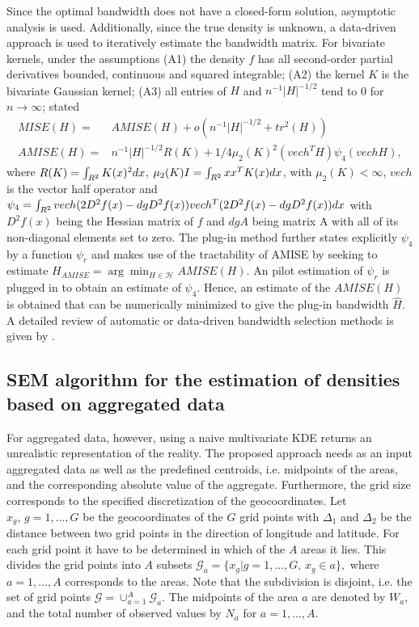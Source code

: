 Since the optimal bandwidth does not have a closed-form solution, asymptotic analysis is used. Additionally, since the true density is unknown, a data-driven approach is used to iteratively estimate the bandwidth matrix. For bivariate kernels, under the assumptions
(A1) the density $f$ has all second-order partial derivatives
bounded, continuous and squared integrable;
(A2) the kernel $K$ is the bivariate Gaussian kernel;
(A3) all entries of $H$ and $n^{-1} |H|^{-1/2}$ tend to 0 for $n \to \infty$; 
\cite{Duong2003} stated 
\begin{align*}
    MISE(H) = & AMISE(H) + o(n^{-1} |H|^{-1/2} + tr^2(H)) \\
    AMISE(H) = & n^{-1} |H|^{-1/2} R(K) + 1/4 \mu_2(K)^2(vech^TH) \psi_4 (vech H),
\end{align*}
where $R(K) = \int_{R^2} K(x)^2 d x$, 
$\mu_2(K)I = \int_{R^2} xx^T K(x) d x$, with $\mu_2(K) < \infty$, $vech$ is the vector half operator and 
$\psi_4 = \int_{R^2} vech(2D^2f(x) - d gD^2 f(x)) vech^T(2D^2f(x) - d gD^2 f(x))d x$ with $D^2f(x)$ being the Hessian matrix of $f$ and $d gA$ being matrix A with all of its non-diagonal elements set to zero. 
The plug-in method further states explicitly $\psi_4$ by a function $\psi_r$ and makes use of the tractability of AMISE by seeking to estimate 
$H_{AMISE} = \arg \min_{H \in \mathcal{H}} AMISE(H)$.
An pilot estimation of $\psi_r$ is plugged in to obtain an estimate of $\psi_4$. Hence, an estimate of the $AMISE(H)$ is obtained that can be numerically minimized to give the plug-in bandwidth $\hat{H}$.   \\
A detailed review of automatic or data-driven bandwidth selection methods is given by \cite{Sperlich2013}. 


\subsection{SEM algorithm for the estimation of densities based on aggregated data}
For aggregated data, however, using a naive multivariate KDE returns an unrealistic representation of the reality. The proposed approach needs as an input aggregated data as well as the predefined centroids, i.e. midpoints of the areas, and the corresponding absolute value of the aggregate. 
Furthermore, the grid size corresponds to the specified discretization of the geocoordinates. Let $x_g,\, g = 1, \dots, G$ be the geocoordinates of the $G$ grid points with $\Delta_1$ and $\Delta_2$ be the distance between two grid points in the direction of longitude and latitude. 
For each grid point it have to be determined in which of the $A$ areas it lies. This divides the grid points into $A$ subsets $\mathcal{G}_a = \{x_g | g = 1, \dots, G,\, x_g \in a \},$ where $a = 1,\dots,A$ corresponds to the areas. Note that the subdivision is disjoint, i.e. the set of grid points $\mathcal{G} = \cup_{a=1}^A \mathcal{G}_a$. 
The midpoints of the area $a$ are denoted by $W_a$, and the total number of observed values by $N_a$ for $a = 1, \dots,A$.

